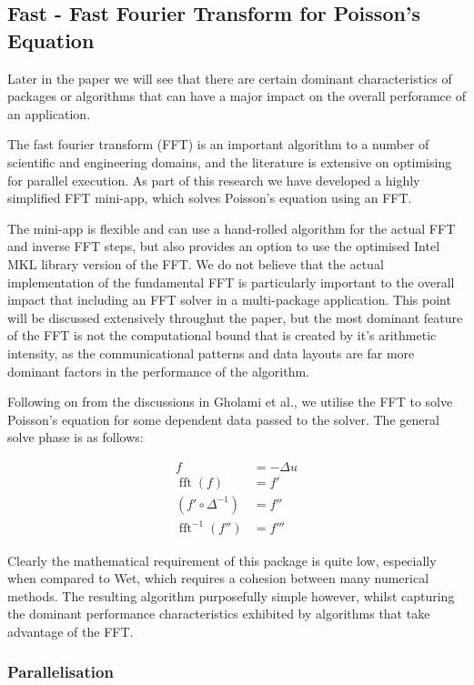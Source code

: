 \documentclass[runningheads,a4paper]{llncs}
\DeclareMathOperator{\fft}{fft}
\begin{document}
\subsection{Fast - Fast Fourier Transform for Poisson's Equation}

Later in the paper we will see that there are certain dominant characteristics of packages or algorithms that can have a major impact on the overall perforamce of an application. 

The fast fourier transform (FFT) is an important algorithm to a number of scientific and engineering domains, and the literature is extensive on optimising for parallel execution. As part of this research we have developed a highly simplified FFT mini-app, which solves Poisson's equation using an FFT.

The mini-app is flexible and can use a hand-rolled algorithm for the actual FFT and inverse FFT steps, but also provides an option to use the optimised Intel MKL library version of the FFT. We do not believe that the actual implementation of the fundamental FFT is particularly important to the overall impact that including an FFT solver in a multi-package application. This point will be discussed extensively throughut the paper, but the most dominant feature of the FFT is not the computational bound that is created by it's arithmetic intensity, as the communicational patterns and data layouts are far more dominant factors in the performance of the algorithm.

Following on from the discussions in Gholami et al., we utilise the FFT to solve Poisson's equation for some dependent data passed to the solver. The general solve phase is as follows:

\begin{align}
  f &= -\Delta u \\
  \fft(f) &= f' \\
  (f' \circ \Delta^{-1}) &= f'' \\
  \fft^{-1}(f'') &= f'''
\end{align}

Clearly the mathematical requirement of this package is quite low, especially when compared to Wet, which requires a cohesion between many numerical methods. The resulting algorithm purposefully simple however, whilst capturing the dominant performance characteristics exhibited by algorithms that take advantage of the FFT.

\subsubsection{Parallelisation}
\end{document}
